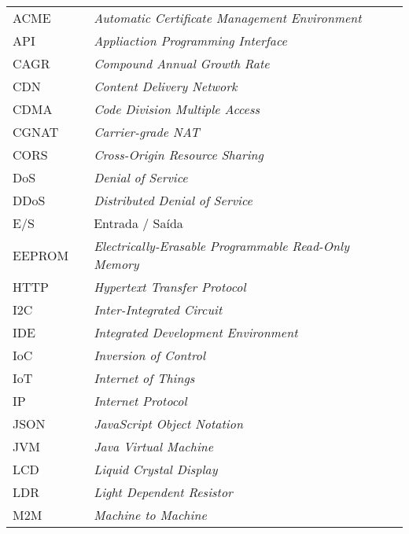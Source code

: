 \begin{table}[H]
\centering
\label{my-label}
\begin{tabular}{lll}
ACME  &  & \textit{Automatic Certificate Management Environment}     \\
API   &  & \textit{Appliaction Programming Interface}                \\
CAGR  &  & \textit{Compound Annual Growth Rate}                      \\
CDN   &  & \textit{Content Delivery Network}                         \\
CDMA  &  & \textit{Code Division Multiple Access}                    \\
CGNAT &  & \textit{Carrier-grade NAT}                                \\
CORS  &  & \textit{Cross-Origin Resource Sharing}                    \\
DoS   &  & \textit{Denial of Service}                                \\
DDoS   &  & \textit{Distributed Denial of Service}                                \\
E/S   &  & Entrada / Saída                                           \\
EEPROM & & \textit{Electrically-Erasable Programmable Read-Only Memory} \\
HTTP  &  & \textit{Hypertext Transfer Protocol}                      \\
I2C   &  & \textit{Inter-Integrated Circuit}                         \\
IDE   &  & \textit{Integrated Development Environment}               \\
IoC   &  & \textit{Inversion of Control}                             \\
IoT   &  & \textit{Internet of Things}                               \\
IP    &  & \textit{Internet Protocol}                                \\
JSON  &  & \textit{JavaScript Object Notation}                       \\
JVM   &  & \textit{Java Virtual Machine}                             \\
LCD   &  & \textit{Liquid Crystal Display}                           \\
LDR   &  & \textit{Light Dependent Resistor}                         \\
M2M   &  & \textit{Machine to Machine}                               \\

\end{tabular}
\end{table}
